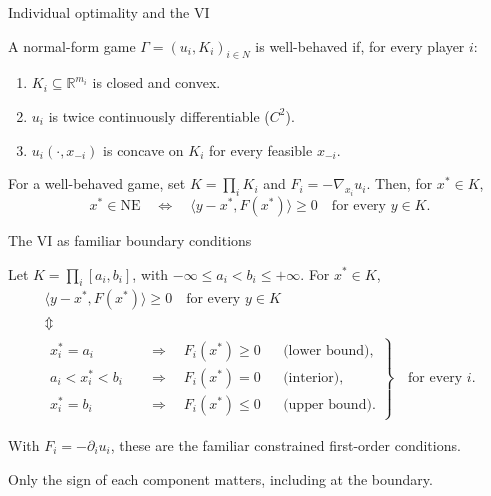 \documentclass[11pt,aspectratio=169]{beamer}
\theoremstyle{plain}
\theoremstyle{definition}
\newcommand{\R}{\mathbb{R}}
\newcommand{\compactmath}{%
 \setlength{\abovedisplayskip}{4pt}\setlength{\belowdisplayskip}{4pt}%
 \setlength{\abovedisplayshortskip}{2pt}\setlength{\belowdisplayshortskip}{4pt}}
\begin{document}
\begin{frame}{Individual optimality and the VI}
\compactmath
\setcounter{theorem}{0}
\begin{definition}
A normal-form game $\Gamma=(u_i,K_i)_{i\in N}$ is \alert{well-behaved} if, for every player $i$:
\begin{enumerate}
 \item $K_i\subseteq\R^{m_i}$ is closed and convex.
 \item $u_i$ is twice continuously differentiable ($C^2$).
 \item $u_i(\cdot,x_{-i})$ is concave on $K_i$ for every feasible $x_{-i}$.
\end{enumerate}
\end{definition}
\setcounter{theorem}{0}
\begin{lemma}
For a well-behaved game, set $K=\prod_i K_i$ and $F_i=-\nabla_{x_i}u_i$.
Then, for $x^*\in K$,
\[
 x^*\in\mathrm{NE}
 \quad\Longleftrightarrow\quad
 \langle y-x^*,F(x^*)\rangle\geq0\quad\text{for every }y\in K.
\]
\end{lemma}
\end{frame}


\begin{frame}{The VI as familiar boundary conditions}
\compactmath
\begin{lemma}
Let $K=\prod_i[a_i,b_i]$, with $-\infty\leq a_i<b_i\leq+\infty$.
For $x^*\in K$,
\[
\begin{gathered}
 \langle y-x^*,F(x^*)\rangle\geq0\quad\text{for every }y\in K
 \\[2pt]
 \Updownarrow
 \\[2pt]
 \left.
 \begin{aligned}
  x_i^*=a_i &\quad\Longrightarrow\quad F_i(x^*)\geq0 &&\text{(lower bound)},\\[3pt]
  a_i<x_i^*<b_i &\quad\Longrightarrow\quad F_i(x^*)=0 &&\text{(interior)},\\[3pt]
  x_i^*=b_i &\quad\Longrightarrow\quad F_i(x^*)\leq0 &&\text{(upper bound)}.
 \end{aligned}
 \right\}\quad\text{for every }i.
\end{gathered}
\]
\end{lemma}
With $F_i=-\partial_i u_i$, these are the familiar constrained first-order conditions.
\medskip\par
\alert{Only the sign of each component matters, including at the boundary.}
\end{frame}
\end{document}
